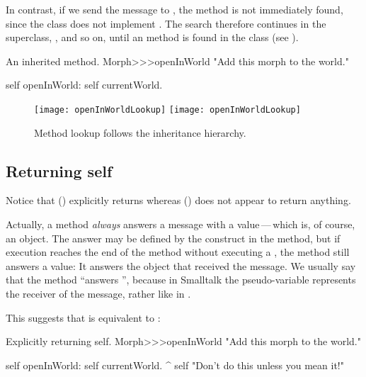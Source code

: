 \documentclass[a4paper,10pt,twoside]{book}
\begin{document}
In contrast, if we send the message  to , the method is not immediately found, since the class  does not implement .
The search therefore continues in the superclass, , and so on, until an  method is found in the class  (see ).

\begin{method}[openInWorld]{An inherited method.}
Morph>>>openInWorld
	"Add this morph to the world."

	self openInWorld: self currentWorld.
\end{method}

\begin{figure}[htb]
\begin{center}
\ifluluelse
	{\texttt{[image: openInWorldLookup]}}
	{\texttt{[image: openInWorldLookup]}}
\caption{Method lookup follows the inheritance hierarchy.\label{fig:openInWorldLookup}}
\end{center}
\end{figure}

\subsection{Returning self}

Notice that  () explicitly returns  whereas  () does not appear to return anything.

Actually, a method \emph{always} answers a message with a value\,---\,which is, of course, an object.
The answer may be defined by the \ct{^} construct in the method, but if execution reaches the end of the method without executing a \ct{^}, the method still answers a value:
It answers the object that received the message.
We usually say that the method ``answers \self'', because in Smalltalk the pseudo-variable \self represents the receiver of the message, rather like  in .

This suggests that  is equivalent to :

\begin{method}[openInWorldReturnSelf]{Explicitly returning self.}
Morph>>>openInWorld
	"Add this morph to the world."

	self openInWorld: self currentWorld.
	^ self		"Don't do this unless you mean it!"
\end{method}
\end{document}
